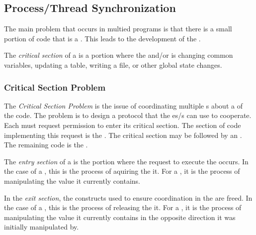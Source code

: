 \subsection{Process/Thread Synchronization}\label{subsec:Synchronization}
The main problem that occurs in multied programs is that there is a small portion of code that is a .
This leads to the development of the .

\begin{definition}\label{def:Critical_Section}
  The \emph{critical section} of a  is a portion where the  and/or  is changing common variables, updating a table, writing a file, or other global state changes.
\end{definition}

\subsubsection{Critical Section Problem}\label{subsubsec:Critical_Section_Problem}
The \emph{Critical Section Problem} is the issue of coordinating multiple s about a  of the code.
The problem is to design a protocol that the es/s can use to cooperate.
Each  must request permission to enter its critical section.
The section of code implementing this request is the .
The critical section may be followed by an .
The remaining code is the .

\begin{definition}\label{def:Entry_Section}
  The \emph{entry section} of a  is the portion where the request to execute the  occurs.
  In the case of a , this is the process of aquiring the it.
  For a , it is the process of manipulating the value it currently contains.
\end{definition}

\begin{definition}\label{def:Exit_Section}
  In the \emph{exit section}, the constructs used to ensure coordination in the  are freed.
  In the case of a , this is the process of releasing the it.
  For a , it is the process of manipulating the value it currently contains in the opposite direction it was initially manipulated by.
\end{definition}

